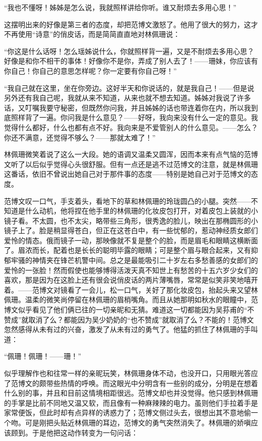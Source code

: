 \par “我也不懂呀！姊姊是怎么说，我就照样讲给你听。谁又耐烦去多用心思！”
\par 这摆明出来的好像是第三者的态度，却把范博文激怒了。他用了很大的努力，这才不再使用“诗意”的俏皮话，而是简简直直地对林佩珊说：
\par “你这是什么话呀！怎么瑶姊说什么，你就照样背一遍，又是不耐烦去多用心思？好像是和你不相干的事体！好像你不是你，弄成了别人去了！——珊妹，你应该有你自己！你自己的意思怎样呢？你一定要有你自己呀！”
\par “我自己就在这里，坐在你旁边。这好半天和你说话的，就是我自己！——但是说另外还有我自己呢，我就从来不知道，从来也就不想去知道。姊姊对我说了许多话，又叮嘱我要守秘密，但既然你问我，并且姊姊的话也带连着你在内，所以我到底照样背了一遍。你问我是什么意见？——好呀，我向来没有什么一定的意见。我觉得什么都好，什么也都有点不好。我向来是不爱管别人的什么意见。——怎么？你还不满意，还觉得不够么？——那就太难了！”
\par 林佩珊微笑着说了这么一大段。她的语调又温柔又圆浑，因而本来有点气恼的范博文听了以后似乎觉得心头很舒服。但有一点还是逃不过范博文的注意，就是林佩珊这番话，依旧不曾说出她自己对于那件事的态度——特别是她自己对于范博文的态度。
\par 范博文叹一口气，手支着头，看地下的草和林佩珊的玲珑圆凸的小腿。突然——不知道是什么动机，他将捏在他手里的林佩珊的化妆皮包打开，对着皮包上装就的小镜子看。不太圆，也不太尖，略带些三角形，很秀逸的脸儿，映出在那椭圆形的小镜子上了。脸是稍显得苍白，但正在这苍白中，有一些忧郁的，惹动神经质女郎们爱怜的情态。俄而镜子一动，那映像就不复是整个的脸，而是眉毛和眼睛这横断面了。眉浓而长，配着也是长长的聪明毕露的眼睛；可是整个眉与眼合起来，又有抑郁牢骚的神情夹在锋芒机警中间。总之是最能吸引二十岁左右多愁善感的女郎们的爱怜的一张脸！然而假使也能够博得活泼天真不知世上有愁苦的十五六岁少女们的喜欢，那是因为在这脸上还有很会说俏皮话的两片薄嘴唇，常常是似笑非笑地嘻开着。——范博文对镜看了一会儿，松一口气，关好了那化妆皮包，抬起头来又望林佩珊。温柔的微笑尚停留在林佩珊的眉梢嘴角。而且从她那明如秋水的眼瞳中，范博文似乎看见了他们俩已往的一切亲昵和无猜。难道这一切都能因为吴荪甫的“不赞成”就取消了么？都能因为吴少奶奶的“也不赞成”就取消了么？不能的！范博文忽然感得从未有过的兴奋，激发了从未有过的勇气了。他猛的抓住了林佩珊的手叫道：
\par “佩珊！佩珊！——珊！”
\par 似乎理解作也和往常一样的亲昵玩笑，林佩珊身体不动，也没开口，只用眼光答应了范博文的颇带些热情的呼唤。而这眼光中分明含有一些别的成分，分明是在想着什么别的事，并且和目前这情境相距很远。范博文却也并没觉得。他只感到林佩珊的手掌是比前不同地又温又软，而且像有一种麻辣辣的电力。虽则他们手拉着手是家常便饭，但此时却有点异样的诱惑力了；范博文侧过头去，很想出其不意地偷一个吻。可是刚把头贴近林佩珊的耳边，范博文的勇气突然消失了。林佩珊的娇嗔应该顾到。于是他把这动作转变为一句问话：
